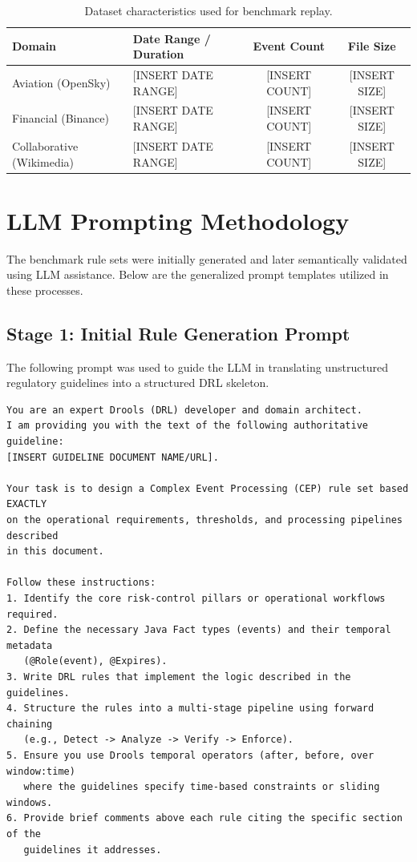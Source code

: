 \documentclass{article}
\begin{document}
\begin{table}[h]
\centering
\caption{Dataset characteristics used for benchmark replay.}\label{tab:metadata}
\begin{tabular}{@{}llcc@{}}
\toprule
\textbf{Domain} & \textbf{Date Range / Duration} & \textbf{Event Count} & \textbf{File Size} \\
\midrule
Aviation (OpenSky) & [INSERT DATE RANGE] & [INSERT COUNT] & [INSERT SIZE] \\
Financial (Binance) & [INSERT DATE RANGE] & [INSERT COUNT] & [INSERT SIZE] \\
Collaborative (Wikimedia) & [INSERT DATE RANGE] & [INSERT COUNT] & [INSERT SIZE] \\
\bottomrule
\end{tabular}
\end{table}

\section{LLM Prompting Methodology}
The benchmark rule sets were initially generated and later semantically validated using LLM assistance. Below are the generalized prompt templates utilized in these processes.

\subsection{Stage 1: Initial Rule Generation Prompt}
The following prompt was used to guide the LLM in translating unstructured regulatory guidelines into a structured DRL skeleton.

\begin{verbatim}
You are an expert Drools (DRL) developer and domain architect. 
I am providing you with the text of the following authoritative guideline: 
[INSERT GUIDELINE DOCUMENT NAME/URL].

Your task is to design a Complex Event Processing (CEP) rule set based EXACTLY 
on the operational requirements, thresholds, and processing pipelines described 
in this document.

Follow these instructions:
1. Identify the core risk-control pillars or operational workflows required.
2. Define the necessary Java Fact types (events) and their temporal metadata 
   (@Role(event), @Expires).
3. Write DRL rules that implement the logic described in the guidelines.
4. Structure the rules into a multi-stage pipeline using forward chaining 
   (e.g., Detect -> Analyze -> Verify -> Enforce).
5. Ensure you use Drools temporal operators (after, before, over window:time) 
   where the guidelines specify time-based constraints or sliding windows.
6. Provide brief comments above each rule citing the specific section of the 
   guidelines it addresses.
\end{verbatim}
\end{document}
